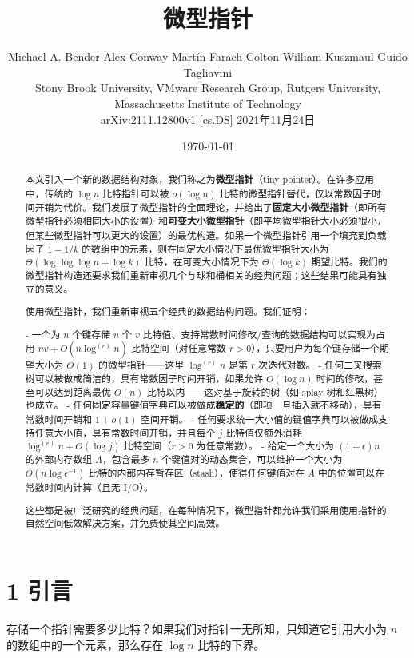 \documentclass[12pt,a4paper]{ctexart}
\title{微型指针}
\author{Michael A. Bender \quad Alex Conway \quad Martín Farach-Colton \quad William Kuszmaul \quad Guido Tagliavini \\
Stony Brook University, VMware Research Group, Rutgers University, Massachusetts Institute of Technology \\
arXiv:2111.12800v1 [cs.DS] 2021年11月24日}
\date{\today}
\theoremstyle{remark}
\begin{document}
\maketitle

\begin{abstract}
本文引入一个新的数据结构对象，我们称之为\textbf{微型指针}（tiny pointer）。在许多应用中，传统的 $\log n$ 比特指针可以被 $o(\log n)$ 比特的微型指针替代，仅以常数因子时间开销为代价。我们发展了微型指针的全面理论，并给出了\textbf{固定大小微型指针}（即所有微型指针必须相同大小的设置）和\textbf{可变大小微型指针}（即平均微型指针大小必须很小，但某些微型指针可以更大的设置）的最优构造。如果一个微型指针引用一个填充到负载因子 $1-1/k$ 的数组中的元素，则在固定大小情况下最优微型指针大小为 $\Theta(\log\log\log n+\log k)$ 比特，在可变大小情况下为 $\Theta(\log k)$ 期望比特。我们的微型指针构造还要求我们重新审视几个与球和桶相关的经典问题；这些结果可能具有独立的意义。

使用微型指针，我们重新审视五个经典的数据结构问题。我们证明：

- 一个为 $n$ 个键存储 $n$ 个 $v$ 比特值、支持常数时间修改/查询的数据结构可以实现为占用 $nv+O(n\log^{(r)}n)$ 比特空间（对任意常数 $r>0$），只要用户为每个键存储一个期望大小为 $O(1)$ 的微型指针——这里 $\log^{(r)}n$ 是第 $r$ 次迭代对数。
- 任何二叉搜索树可以被做成简洁的，具有常数因子时间开销，如果允许 $O(\log n)$ 时间的修改，甚至可以达到距离最优 $O(n)$ 比特以内——这对基于旋转的树（如 splay 树和红黑树）也成立。
- 任何固定容量键值字典可以被做成\textbf{稳定的}（即项一旦插入就不移动），具有常数时间开销和 $1+o(1)$ 空间开销。
- 任何要求统一大小值的键值字典可以被做成支持任意大小值，具有常数时间开销，并且每个 $j$ 比特值仅额外消耗 $\log^{(r)}n+O(\log j)$ 比特空间（$r>0$ 为任意常数）。
- 给定一个大小为 $(1+\epsilon)n$ 的外部内存数组 $A$，包含最多 $n$ 个键值对的动态集合，可以维护一个大小为 $O(n\log\epsilon^{-1})$ 比特的内部内存暂存区（stash），使得任何键值对在 $A$ 中的位置可以在常数时间内计算（且无 I/O）。

这些都是被广泛研究的经典问题，在每种情况下，微型指针都允许我们采用使用指针的自然空间低效解决方案，并免费使其空间高效。
\end{abstract}



\medskip
\section{1 引言}
存储一个指针需要多少比特？如果我们对指针一无所知，只知道它引用大小为 $n$ 的数组中的一个元素，那么存在 $\log n$ 比特的下界。
\end{document}
